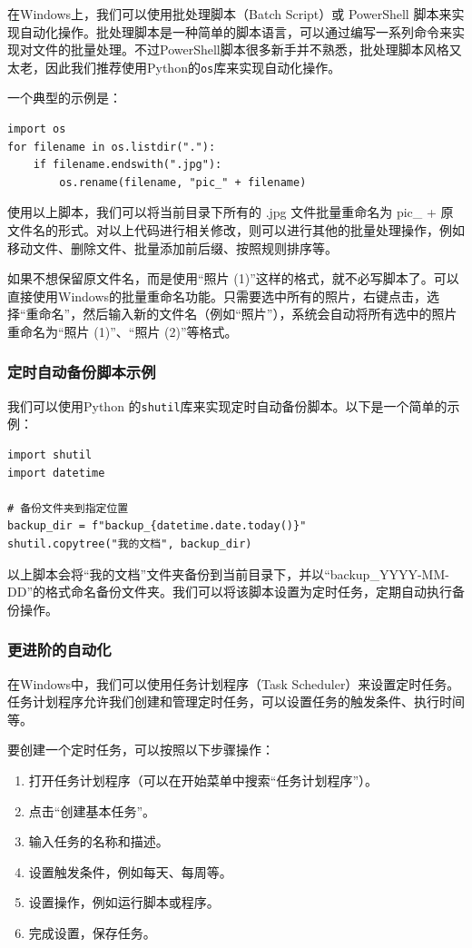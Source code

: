 \documentclass[../main.tex]{subfiles}
\begin{document}
在Windows上，我们可以使用批处理脚本（Batch Script）或 PowerShell 脚本来实现自动化操作。批处理脚本是一种简单的脚本语言，可以通过编写一系列命令来实现对文件的批量处理。不过PowerShell脚本很多新手并不熟悉，批处理脚本风格又太老，因此我们推荐使用Python的\texttt{os}库来实现自动化操作。

一个典型的示例是：

\begin{verbatim}
import os
for filename in os.listdir("."):  
    if filename.endswith(".jpg"):  
        os.rename(filename, "pic_" + filename)  
\end{verbatim}

使用以上脚本，我们可以将当前目录下所有的 .jpg 文件批量重命名为 pic\_ + 原文件名的形式。对以上代码进行相关修改，则可以进行其他的批量处理操作，例如移动文件、删除文件、批量添加前后缀、按照规则排序等。

如果不想保留原文件名，而是使用“照片 (1)”这样的格式，就不必写脚本了。可以直接使用Windows的批量重命名功能。只需要选中所有的照片，右键点击，选择“重命名”，然后输入新的文件名（例如“照片”），系统会自动将所有选中的照片重命名为“照片 (1)”、“照片 (2)”等格式。

\subsubsection{定时自动备份脚本示例}

我们可以使用Python 的\texttt{shutil}库来实现定时自动备份脚本。以下是一个简单的示例：
\begin{verbatim}
import shutil  
import datetime  

# 备份文件夹到指定位置  
backup_dir = f"backup_{datetime.date.today()}"  
shutil.copytree("我的文档", backup_dir)  
\end{verbatim}

以上脚本会将“我的文档”文件夹备份到当前目录下，并以“backup\_YYYY-MM-DD”的格式命名备份文件夹。我们可以将该脚本设置为定时任务，定期自动执行备份操作。

\subsubsection{更进阶的自动化}

在Windows中，我们可以使用任务计划程序（Task Scheduler）来设置定时任务。任务计划程序允许我们创建和管理定时任务，可以设置任务的触发条件、执行时间等。

要创建一个定时任务，可以按照以下步骤操作：
\begin{enumerate}
  \item 打开任务计划程序（可以在开始菜单中搜索“任务计划程序”）。
  \item 点击“创建基本任务”。
  \item 输入任务的名称和描述。
  \item 设置触发条件，例如每天、每周等。
  \item 设置操作，例如运行脚本或程序。
  \item 完成设置，保存任务。
\end{enumerate}
\end{document}
